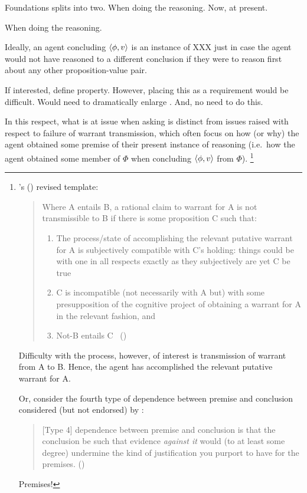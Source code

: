 \begin{note}
  Foundations splits into two.
  When doing the reasoning.
  Now, at present.

  When doing the reasoning.

  Ideally, an agent concluding \(\langle \phi, v \rangle\) is an instance of XXX  just in case the agent would not have reasoned to a different conclusion if they were to reason first about any other proposition-value pair.

  If interested, define property.
  However, placing this as a requirement would be difficult.
  Would need to dramatically enlarge .
  And, no need to do this.

  In this respect, what is at issue when asking \qzS{} is distinct from issues raised with respect to failure of warrant transmission, which often focus on how (or why) the agent obtained some premise of their present instance of reasoning (i.e.\ how the agent obtained some member of \(\Phi\) when concluding \(\langle \phi, v \rangle\) from \(\Phi\)).%
  \footnote{
    \citeauthor{Wright:2011wn}'s (\citeyear{Wright:2011wn}) revised template:
    \begin{quote}
      Where A entails B, a rational claim to warrant for A is not transmissible to B if there is some proposition C such that:
      \begin{enumerate}[label=(\roman*), noitemsep]
      \item
        The process/state of accomplishing the relevant putative warrant for A is subjectively compatible with C’s holding: things could be with one in all respects exactly as they subjectively are yet C be true
      \item
        C is incompatible (not necessarily with A but) with some presupposition of the cognitive project of obtaining a warrant for A in the relevant fashion, and
      \item
        Not-B entails C%
      \mbox{ }\hfill\mbox{(\citeyear[93]{Wright:2011wn})}
      \end{enumerate}
    \end{quote}
    Difficulty with the process, however, of interest is transmission of warrant from A to B.
    Hence, the agent has accomplished the relevant putative warrant for A.

    Or, consider the fourth type of dependence between premise and conclusion considered (but not endorsed) by \textcite{Pryor:2004ws}:

  \begin{quote}
    [Type 4] dependence between premise and conclusion is that the conclusion be such that evidence \emph{against it} would (to at least some degree) undermine the kind of justification you purport to have for the premises.%
    \mbox{}\hfill\mbox{(\citeyear[359]{Pryor:2004ws})}
  \end{quote}
  Premises!

}
\end{note}
